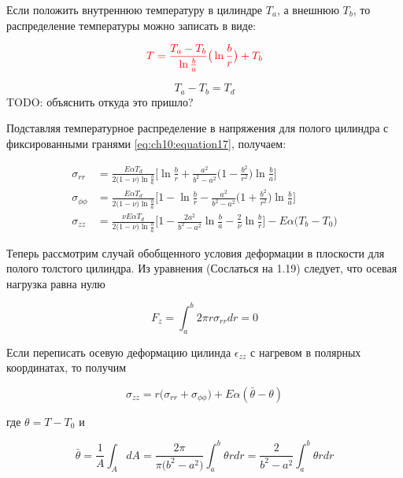 Если положить внутреннюю температуру в цилиндре \(T_a\), а внешнюю \(T_b\), то распределение температуры можно записать в виде:

\begin{equation}
	\label{eq:ch10:equation20}
	{\color{red}T=\frac{T_a - T_b}{\ln{\frac{b}{a}}} \big(\ln{\frac{b}{r}} \big) + T_b}
\end{equation}

\[T_a - T_b = T_d\]
{\color{red}TODO: объяснить откуда это пришло?}

Подставляя температурное распределение в напряжения для полого цилиндра с фиксированными гранями \cref{eq:ch10:equation17}, получаем:

\begin{equation}
	\label{eq:ch10:equation21}
	\begin{split}
		\sigma_{rr} &= \frac{E \alpha T_d}{2 \big (1 -\nu \big) \ln{\frac{b}{a}}}\big[ \ln{\frac{b}{r}} + \frac{a^2}{b^2-a^2} \big(1-\frac{b^2}{r^2} \big) \ln{\frac{b}{a}}\big]\\
		\sigma_{\phi\phi} &= \frac{E \alpha T_d}{2 \big (1-\nu \big ) \ln{\frac{b}{a}} }\big[1 - \ln{\frac{b}{r}} - \frac{a^2}{b^2-a^2}\big(1+\frac{b^2}{r^2} \big)\ln{\frac{b}{a}} \big] \\
		\sigma_{zz} &= \frac{\nu E \alpha T_d}{2 \big (1-\nu \big) \ln{\frac{b}{a}}} \big [1-\frac{2 a^2}{b^2 - a^2}\ln{\frac{b}{a}}-\frac{2}{\nu} \ln{\frac{b}{r}} \big] - E \alpha \big(T_b - T_0 \big)
	\end{split}
\end{equation}

Теперь рассмотрим случай обобщенного условия деформации в плоскости для полого толстого цилиндра. Из уравнения ({\color{red}Сослаться на 1.19}) следует, что осевая нагрузка равна нулю

\begin{equation}
	\label{eq:ch10:equation22}
	F_z = \int_a^b 2 \pi r \sigma_{rr} dr = 0
\end{equation}

Если переписать осевую деформацию цилинда \(\epsilon_{zz}\) с нагревом в полярных координатах, то получим

\begin{equation}
	\label{eq:ch10:equation23}
	\sigma_{zz} = r \big (\sigma_{rr}+\sigma_{\phi\phi} \big) + E \alpha (\bar{\theta} - \theta)
\end{equation}

где \(\theta = T - T_0\) и

\begin{equation}
	\label{eq:ch10:equation24}
	\bar{\theta} = \frac{1}{A} \int_A dA = \frac{2 \pi}{\pi \big (b^2 - a^2 \big)} \int_a^b \theta rdr = \frac{2}{b^2-a^2} \int_a^b \theta rdr
\end{equation}


